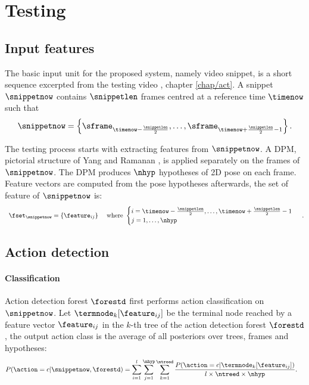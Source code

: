 \section{Testing}

\subsection{Input features}

The basic input unit for the proposed system, namely video snippet, is a short sequence excerpted from the testing video \cite{Schindler2008}, \cf chapter \ref{chap/act}. A snippet $\snippetnow$ contains $\snippetlen$ frames centred at a reference time $\timenow$ such that
\begin{equation}
	\label{eqn/body/snippetnow}
	\snippetnow = \left\{ \sframe_{\timenow - \frac{\snippetlen}{2}}, \dots, \sframe_{\timenow + \frac{\snippetlen}{2} - 1} \right\}.
\end{equation}

The testing process starts with extracting features from $\snippetnow$. A DPM, \eg pictorial structure of Yang and Ramanan \cite{Yang2011}, is applied separately on the frames of $\snippetnow$. The DPM produces $\nhyp$ hypotheses of 2D pose on each frame. Feature vectors are computed from the pose hypotheses afterwards, the set of feature of $\snippetnow$ is:
\begin{equation}
	\begin{array}{lr}
		\fset_{\snippetnow} = \{ \feature_{ij}\} & \mbox{ where } 
		\begin{cases}
			i =\timenow-\frac{\snippetlen}{2},\dots,\timenow+\frac{\snippetlen}{2}-1 \\ 
			j=1,\dots,\nhyp
		\end{cases}
	\end{array}.
\end{equation} 

\subsection{Action detection} 

\paragraph{Classification}
Action detection forest $\forestd$ first performs action classification on $\snippetnow$. Let $\termnode_k[\feature_{ij}]$ be the terminal node reached by a feature vector $\feature_{ij}$ in the $k$-th tree of the action detection forest $\forestd$, the output action class is the average of all posteriors over trees, frames and hypotheses:   
\begin{equation}
	\label{eqn/body/actionclassification} 
	\begin{aligned}
	P(\action & = c | \snippetnow, \forestd) = \displaystyle \sum_{i = 1}^{l} \sum_{j = 1}^{\nhyp} \sum_{k = 1}^{\ntreed} \frac {P(\action=c|\termnode_{k}[\feature_{ij}])} {l\times\ntreed\times\nhyp}.
	\end{aligned}
\end{equation}

